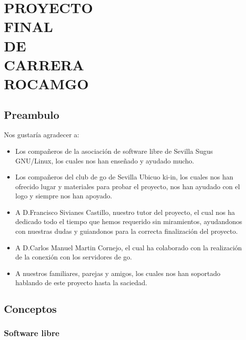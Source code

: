 \documentclass[12pt,a4paper]{report}
\author{David Medina Velasco \and Víctor Ramírez de la Corte}
\begin{document}
\part*{PROYECTO\\ FINAL\\ DE \\CARRERA \\ ROCAMGO\\}

\marginsize{3cm}{2cm}{2cm}{2cm} %

\tableofcontents  %
 

 
\chapter*{Preambulo} 

Nos gustaría agradecer a:
\begin{itemize}
\item Los compañeros de la asociación de software libre de Sevilla Sugus GNU/Linux, los cuales nos han enseñado y ayudado mucho.
\item Los compañeros del club de go de Sevilla Ubicuo ki-in, los cuales nos han ofrecido lugar y materiales para probar el proyecto, nos han ayudado con el logo y siempre nos han apoyado. 
\item A D.Francisco Sivianes Castillo, nuestro tutor del proyecto, el cual nos ha dedicado todo el tiempo que hemos requerido sin miramientos, ayudandonos con nuestras dudas y guiandonos para la correcta finalización del proyecto.
\item A D.Carlos Manuel Martin Cornejo, el cual ha colaborado con la realización de la conexión con los servidores de go.
\item A nuestros familiares, parejas y amigos, los cuales nos han soportado hablando de este proyecto hasta la saciedad.
 
\end{itemize}


\chapter{Conceptos}
\section{Software libre}
\end{document}
